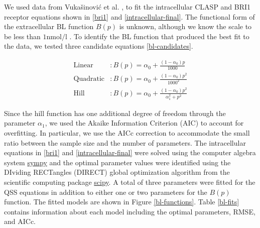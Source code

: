 \documentclass[referee,pdflatex,sn-mathphys-num]{sn-jnl}
\newcommand{\nm}{\unit{\nano\mole\per\litre}}
\begin{document}
We used data from Vukašinović et al. \cite{vukasinovic2021}, to fit the intracellular CLASP and BRI1 receptor equations shown in \eqref{bri1} and \eqref{intracellular-final}.
The functional form of the extracellular BL function $B(p)$ is unknown, although we know the scale to be less than $1\nm$  \cite{vanesse2012}.
To identify the BL function that produced the best fit to the data, we tested three candidate equations \eqref{bl-candidates}.

\begin{equation}
\label{bl-candidates}
\begin{aligned}
  \text{Linear}&: B(p) = \alpha_{0} + \frac{(1 - \alpha_{0})p}{1000} \\[5pt]
  \text{Quadratic}&: B(p) = \alpha_{0} + \frac{(1 - \alpha_{0})p^{2}}{1000^{2}} \\[5pt]
  \text{Hill}&: B(p) = \alpha_{0} + \frac{(1 - \alpha_{0})p^{2}}{\alpha_{1}^{2} + p^{2}}
\end{aligned}
\end{equation}

Since the hill function has one additional degree of freedom through the parameter $\alpha_{1}$, we used the Akaike Information Criterion (AIC) \cite{akaike1974} to account for overfitting.
In particular, we use the AICc correction \cite{sugiura1978} to accommodate the small ratio between the sample size and the number of parameters.
The intracellular equations in \eqref{bri1} and \eqref{intracellular-final} were solved using the computer algebra system \href{https://www.sympy.org/en/index.html}{sympy} and the optimal parameter values were identified using the DIviding RECTangles (DIRECT) global optimization algorithm \cite{jones1993} from the scientific computing package \href{https://docs.scipy.org/doc/scipy/reference/generated/scipy.optimize.direct.html}{scipy}.
A total of three parameters were fitted for the QSS equations in addition to either one or two parameters for the $B(p)$ function.
The fitted models are shown in Figure \ref{bl-functions}.
Table \ref{bl-fits} contains information about each model including the optimal parameters, RMSE, and AICc.
\end{document}
